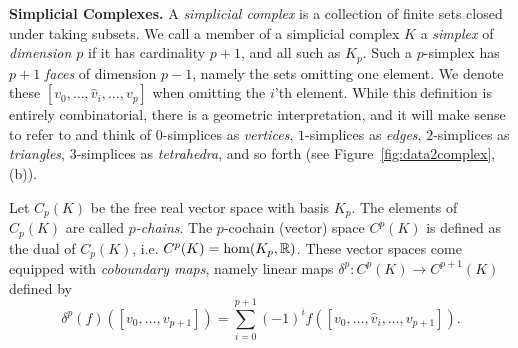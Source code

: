 \textbf{Simplicial Complexes.} A \emph{simplicial complex} is a collection of finite sets closed under taking subsets. We call a member of a simplicial complex $K$ a \emph{simplex} of \emph{dimension $p$} if it has cardinality $p+1$, and all such as $K_p$. Such a $p$-simplex has $p+1$ \emph{faces} of dimension $p-1$, namely the sets omitting one element. We denote these $[v_0,\dotsc,\hat{v}_i,\dotsc, v_p]$ when omitting the $i$'th element. While this definition is entirely combinatorial, there is a geometric interpretation, and it will make sense to refer to and think of $0$-simplices as \emph{vertices}, $1$-simplices as \emph{edges}, $2$-simplices as \emph{triangles}, $3$-simplices as \emph{tetrahedra}, and so forth (see Figure~\ref{fig:data2complex}, (b)).

Let $C_p(K)$ be the free real vector space with basis $K_p$. The elements of $C_p(K)$ are called \emph{$p$-chains}. The $p$-cochain (vector) space $C^p(K)$ is defined as the dual of $C_p(K)$, i.e. $C^p(K)=\hom(K_p,\mathbb{R})$. These vector spaces come equipped with \emph{coboundary maps}, namely linear maps $\delta^p:C^p(K)\to C^{p+1}(K)$ defined by
\begin{equation*}
\delta^p(f)([v_0,\dotsc,v_{p+1}]) = \sum_{i=0}^{p+1} (-1)^i f([v_0,\dotsc,\hat{v}_i,\dotsc,v_{p+1}]).
\end{equation*}

